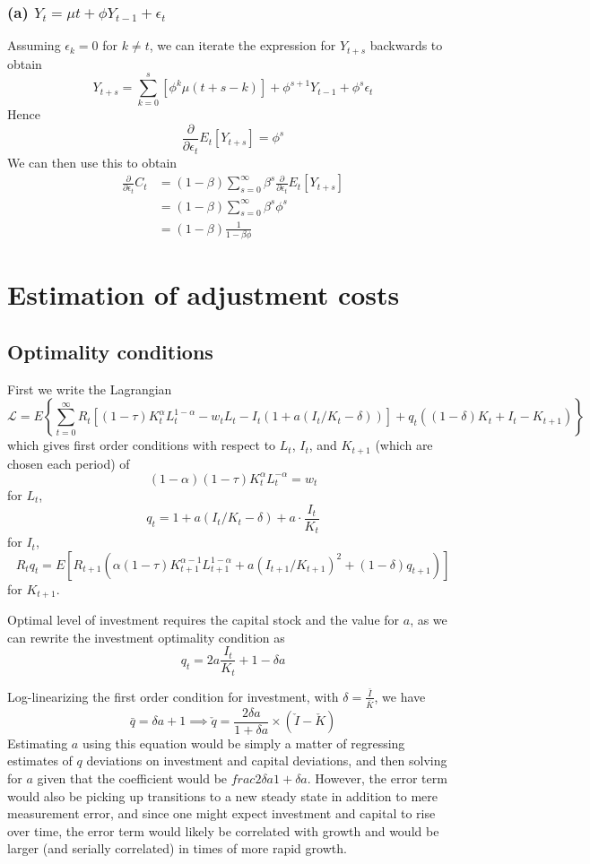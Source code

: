 \documentclass[11pt]{amsart}
\begin{document}
\subsubsection*{(a) $Y_t = \mu t + \phi Y_{t-1} + \epsilon_t$}
Assuming $\epsilon_k = 0$ for $k \neq t$, we can iterate the expression for $Y_{t+s}$ backwards to obtain
\[
Y_{t+s} = \sum_{k=0}^s \left[ \phi^k \mu (t+s-k) \right] + \phi^{s+1} Y_{t-1} + \phi^s \epsilon_t
\]
Hence
\[
\frac{\partial}{\partial \epsilon_t} E_t [Y_{t+s}] = \phi^s
\]
We can then use this to obtain
\begin{align*}
	\frac{\partial}{\partial \epsilon_t} C_t &= (1-\beta) \sum_{s=0}^\infty \beta^s \frac{\partial}{\partial \epsilon_t} E_t [Y_{t+s}] \\
	&= (1-\beta) \sum_{s=0}^\infty \beta^s \phi^s \\
	&= (1-\beta) \frac{1}{1-\beta \phi}
\end{align*}
\section{Estimation of adjustment costs}

\subsection{Optimality conditions}

First we write the Lagrangian
\[
\mathcal{L} = E \left\{ \sum_{t=0}^{\infty} R_t \left[(1 - \tau) K_t^{\alpha} L_t^{1-\alpha} - w_t L_t - I_t \left(1 + a(I_t / K_t - \delta) \right) \right] + q_t ((1-\delta) K_t + I_t - K_{t+1}) \right\}
\]
which gives first order conditions with respect to $L_t$, $I_t$, and $K_{t+1}$ (which are chosen each period) of
\[
(1-\alpha)(1 - \tau) K_t^{\alpha} L_t^{-\alpha} = w_t
\]
for $L_t$,
\[
q_t = 1 + a(I_t / K_t - \delta) + a \cdot \frac{I_t}{K_t}
\]
for $I_t$,
\[
R_t q_t = E \left[ R_{t+1} (\alpha (1-\tau) K_{t+1}^{\alpha-1} L_{t+1}^{1-\alpha} + a(I_{t+1} / K_{t+1})^2 + (1-\delta) q_{t+1} )\right]
\]
for $K_{t+1}$.

Optimal level of investment requires the capital stock and the value for $a$, as we can rewrite the investment optimality condition as
\[
q_t = 2a \frac{I_t}{K_t} + 1 - \delta a
\]


Log-linearizing the first order condition for investment, with $\delta = \frac{\bar{I}}{\bar{K}}$, we have
\[
\bar{q} = \delta a + 1 \implies \check{q} = \frac{2 \delta a}{1 + \delta a} \times (\check{I} - \check{K})
\]
Estimating $a$ using this equation would be simply a matter of regressing estimates of $q$ deviations on investment and capital deviations, and then solving for $a$ given that the coefficient would be $frac{2 \delta a}{1 + \delta a}$. However, the error term would also be picking up transitions to a new steady state in addition to mere measurement error, and since one might expect investment and capital to rise over time, the error term would likely be correlated with growth and would be larger (and serially correlated) in times of more rapid growth.
\end{document}
